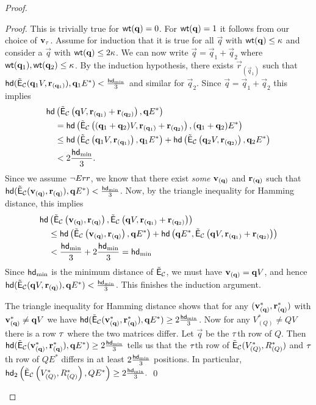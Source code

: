 \begin{proof}
\begin{proof}
This is trivially true for $\mathsf{wt}(\mathbf{q})=0$. For $\mathsf{wt}(\mathbf{q})=1$ it follows from our choice of ${\mathbf{v}}_\tau$. Assume for induction that it is true for all $\vec{q}$ with $\mathsf{wt}(\mathbf{q})\leq \kappa$ and consider a $\vec{q}$ with $\mathsf{wt}(\mathbf{q})\leq 2\kappa$.
We can now write $\vec{q}=\vec{q}_1+\vec{q}_2$ where $\mathsf{wt}(\mathbf{q}_1),\mathsf{wt}(\mathbf{q}_2)\leq \kappa$. By the induction hypothesis, there exists $\vec{r}_{(\vec{q}_1)}$ such that
$\mathsf{hd}(\tilde{\mathsf{E}}_{\mathcal{C}}(\mathbf{q}_1 V,\mathbf{r}_{(\mathbf{q}_1)}), \mathbf{q}_1 E^*)< \frac{\mathsf{hd}_{\mathrm{min}}}{3}$ and similar for $\vec{q}_2$. Since $\vec{q}=\vec{q}_1+\vec{q}_2$ this implies 
\begin{align*}
\mathsf{hd}&\left(\tilde{\mathsf{E}}_{\mathcal{C}} \left(\mathbf{q} V, \mathbf{r}_{(\mathbf{q}_1)}+\mathbf{r}_{(\mathbf{q}_2)}\right), \mathbf{q} E^*\right)\\
&= \mathsf{hd}\left(\tilde{\mathsf{E}}_{\mathcal{C}}\left((\mathbf{q}_1+\mathbf{q}_2) V, \mathbf{r}_{(\mathbf{q}_1)}+\mathbf{r}_{(\mathbf{q}_2)}\right),(\mathbf{q}_1+\mathbf{q}_2) E^*\right)\\
&\leq \mathsf{hd}\left(\tilde{\mathsf{E}}_{\mathcal{C}} \left(\mathbf{q}_1 V,\mathbf{r}_{(\mathbf{q}_1)}\right),\mathbf{q}_1 E^*\right)+\mathsf{hd}\left(\tilde{\mathsf{E}}_{\mathcal{C}} \left(\mathbf{q}_2 V, \mathbf{r}_{(\mathbf{q}_2)}\right),\mathbf{q}_2 E^*\right)\\
&< 2\frac{\mathsf{hd}_{\mathrm{min}}}{3}.
\end{align*}
Since we assume $\neg Err$, we know that there exist \emph{some} ${\mathbf{v}}_{(\mathbf{q})}$ and $\mathbf{r}_{(\mathbf{q})}$ such that $\mathsf{hd}(\tilde{\mathsf{E}}_{\mathcal{C}}({\mathbf{v}}_{(\mathbf{q})},\mathbf{r}_{(\mathbf{q})}),\mathbf{q} E^*)<\frac{\mathsf{hd}_{\mathrm{min}}}{3}$. Now, by the triangle inequality for Hamming distance, this implies
\begin{align*}
\mathsf{hd}&\left(\tilde{\mathsf{E}}_{\mathcal{C}}\left({\mathbf{v}}_{(\mathbf{q})},\mathbf{r}_{(\mathbf{q})}\right), \tilde{\mathsf{E}}_{\mathcal{C}}\left(\mathbf{q} V, \mathbf{r}_{(\mathbf{q}_1)}+\mathbf{r}_{(\mathbf{q}_2)}\right)\right)\\
&\leq \mathsf{hd}\left(\tilde{\mathsf{E}}_{\mathcal{C}}\left({\mathbf{v}}_{(\mathbf{q}) },\mathbf{r}_{(\mathbf{q})}\right),\mathbf{q} E^*\right) + \mathsf{hd}\left(\mathbf{q} E^*,\tilde{\mathsf{E}}_{\mathcal{C}}\left(\mathbf{q} V,\mathbf{r}_{(\mathbf{q}_1)}+\mathbf{r}_{(\mathbf{q}_2)}\right)\right)\\
&< \frac{\mathsf{hd}_{\mathrm{min}}}{3}+2\frac{\mathsf{hd}_{\mathrm{min}}}{3} = \mathsf{hd}_{\mathrm{min}}
\end{align*}
Since $\mathsf{hd}_{\mathrm{min}}$ is the minimum distance of $\tilde{\mathsf{E}}_{\mathcal{C}}$, we must have ${\mathbf{v}}_{(\mathbf{q})}=\mathbf{q} V$, and hence $\mathsf{hd}(\tilde{\mathsf{E}}_{\mathcal{C}}(\mathbf{q} V, \mathbf{r}_{(\mathbf{q})}), \mathbf{q} E^*)< \frac{\mathsf{hd}_{\mathrm{min}}}{3}$. This finishes the induction argument. 

The triangle inequality for Hamming distance shows that for any $({\mathbf{v}}_{(\mathbf{q})}^*,\mathbf{r}_{(\mathbf{q})}^*)$ with ${\mathbf{v}}_{(\mathbf{q})}^*\neq \mathbf{q} V$ we have $\mathsf{hd}(\tilde{\mathsf{E}}_{\mathcal{C}}({\mathbf{v}}_{(\mathbf{q})}^*,\mathbf{r}_{(\mathbf{q})}^*),\mathbf{q} E^*)\geq 2\frac{\mathsf{hd}_{\mathrm{min}}}{3}$. Now for any $V_{(Q)}^*\neq QV$ there is a row $\tau$ where the two matrices differ. Let $\vec{q}$ be the $\tau$th row of $Q$. Then $\mathsf{hd}(\tilde{\mathsf{E}}_{\mathcal{C}}({\mathbf{v}}_{(\mathbf{q})}^*,\mathbf{r}_{(\mathbf{q})}^*),\mathbf{q} E^*)\geq 2\frac{\mathsf{hd}_{\mathrm{min}}}{3}$ tells us that the $\tau$th row of $\tilde{\mathsf{E}}_{\mathcal{C}}(V_{(Q)}^*,R_{(Q)}^*)$ and $\tau$th row of $QE^*$ differs in at least $2\frac{\mathsf{hd}_{\mathrm{min}}}{3}$ positions. In particular, $ \mathsf{hd}_2\left(\tilde{\mathsf{E}}_{\mathcal{C}}\left(V_{(Q)}^*,R_{(Q)}^*\right),QE^*\right)\geq 2\frac{\mathsf{hd}_{\mathrm{min}}}{3}.$ \qed
\end{proof}


\end{proof}
